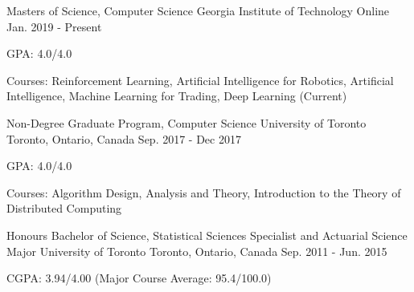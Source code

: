 
\begin{cventries}
  \cventry
    {Masters of Science, Computer Science} %
    {Georgia Institute of Technology} %
    {Online} %
    {Jan. 2019 - Present} %
    {GPA: 4.0/4.0\newline \hphantom{0}
      \begin{cvitems}
        \item {Courses: Reinforcement Learning, Artificial Intelligence for Robotics, Artificial Intelligence, Machine Learning for Trading, Deep Learning (Current)}
      \end{cvitems}
    }
\end{cventries}

\begin{cventries}
  \cventry
    {Non-Degree Graduate Program, Computer Science} %
    {University of Toronto} %
    {Toronto, Ontario, Canada} %
    {Sep. 2017 - Dec 2017} %
    {GPA: 4.0/4.0\newline \hphantom{0}
      \begin{cvitems}
        \item {Courses: Algorithm Design, Analysis and Theory, Introduction to the Theory of Distributed Computing}
      \end{cvitems}
    }
\end{cventries}

\begin{cventries}
  \cventry
    {Honours Bachelor of Science, Statistical Sciences Specialist and Actuarial Science Major} %
    {University of Toronto} %
    {Toronto, Ontario, Canada} %
    {Sep. 2011 - Jun. 2015} %
    {CGPA: 3.94/4.00 (Major Course Average: 95.4/100.0)\newline \hphantom{0}
    \iffalse
      \begin{cvitems}
        \item {Courses: Data Mining, Statistcal Computation, Time Series, Stochastc Processes, Loss Models, Real Analysis, Financial Mathematics}
      \end{cvitems}
    \fi
    }\newline
\end{cventries}
